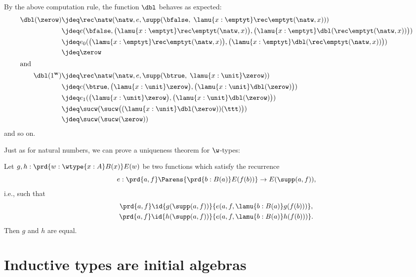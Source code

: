 By the above computation rule, the function $\dbl$ behaves as expected:
\begin{align*}
\dbl(\zerow) & \jdeq \rec\natw(\natw, e, \supp(\bfalse, \; \lamu{x:\emptyt} \rec\emptyt(\natw,x))) \\
& \jdeq e(\bfalse, \big(\lamu{x:\emptyt} \rec\emptyt(\natw,x)\big),
   \big(\lamu{x:\emptyt} \dbl(\rec\emptyt(\natw,x))\big)) \\
 & \jdeq e_0(\big(\lamu{x:\emptyt} \rec\emptyt(\natw,x)\big), \big(\lamu{x:\emptyt} \dbl(\rec\emptyt(\natw,x))\big))\\
 & \jdeq \zerow \\
 \intertext{and}
\dbl(1^{\mathbf{w}}) & \jdeq \rec\natw(\natw, e, \supp(\btrue, \; \lamu{x:\unit} \zerow)) \\
& \jdeq e(\btrue, \big(\lamu{x:\unit} \zerow\big), \big(\lamu{x:\unit} \dbl(\zerow)\big)) \\
 & \jdeq e_1(\big(\lamu{x:\unit} \zerow\big), \big(\lamu{x:\unit} \dbl(\zerow)\big)) \\
 & \jdeq \sucw(\sucw\big((\lamu{x:\unit} \dbl(\zerow))(\ttt)\big))\\
 & \jdeq \sucw(\sucw(\zerow))
\end{align*}
and so on.

Just as for natural numbers, we can prove a uniqueness theorem for
$\w$-types:
\begin{thm}\label{thm:w-uniq}
Let $g,h : \prd{w:\wtype{x:A}B(x)} E(w)$ be two functions which satisfy the recurrence
%
\begin{equation*}
  e : \prd{a,f} \Parens{\prd{b : B(a)} E(f(b))} \to  E(\supp(a,f)),
\end{equation*}
%
i.e., such that
%
\begin{gather*}
 \prd{a,f} \id{g(\supp(a,f))} {e(a,f,\lamu{b:B(a)} g(f(b)))}, \\
 \prd{a,f} \id{h(\supp(a,f))}{e(a,f,\lamu{b:B(a)} h(f(b)))}.
\end{gather*}
Then $g$ and $h$ are equal.
\end{thm}


\section{Inductive types are initial algebras}
\label{sec:initial-alg}

%

